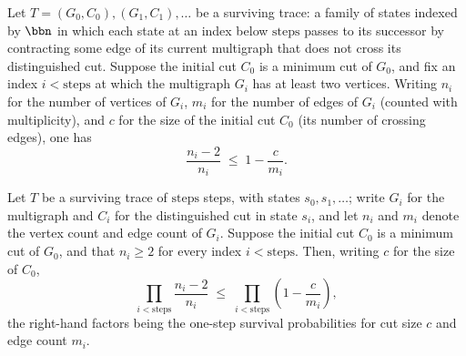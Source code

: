 \begin{lemma}
\label{KargerTrace.survivingTrace_survivalProb_ge_factor}
\leanok
{}
Let $T = (G_0, C_0), (G_1, C_1), \dots$ be a surviving trace: a family of states indexed
by $\bbn$ in which each state at an index below $\text{steps}$ passes to its successor
by contracting some edge of its current multigraph that does not cross its distinguished
cut. Suppose the initial cut $C_0$ is a minimum cut of $G_0$, and fix an index $i <
\text{steps}$ at which the multigraph $G_i$ has at least two vertices. Writing $n_i$ for
the number of vertices of $G_i$, $m_i$ for the number of edges of $G_i$ (counted with
multiplicity), and $c$ for the size of the initial cut $C_0$ (its number of crossing
edges), one has
\[
  \frac{n_i - 2}{n_i} \;\le\; 1 - \frac{c}{m_i}.
\]
\end{lemma}

\begin{lemma}
\label{KargerTrace.survivingTrace_factor_product_le_survival_product}
\leanok
{}
Let $T$ be a surviving trace of $\mathrm{steps}$ steps, with states $s_0, s_1, \dots$;
write $G_i$ for the multigraph and $C_i$ for the distinguished cut in state $s_i$, and
let $n_i$ and $m_i$ denote the vertex count and edge count of $G_i$. Suppose the initial
cut $C_0$ is a minimum cut of $G_0$, and that $n_i \ge 2$ for every index $i <
\mathrm{steps}$. Then, writing $c$ for the size of $C_0$,
\[
  \prod_{i < \mathrm{steps}} \frac{n_i - 2}{n_i}
  \;\le\;
  \prod_{i < \mathrm{steps}} \left(1 - \frac{c}{m_i}\right),
\]
the right-hand factors being the one-step survival probabilities for cut size $c$ and
edge count $m_i$.
\end{lemma}

